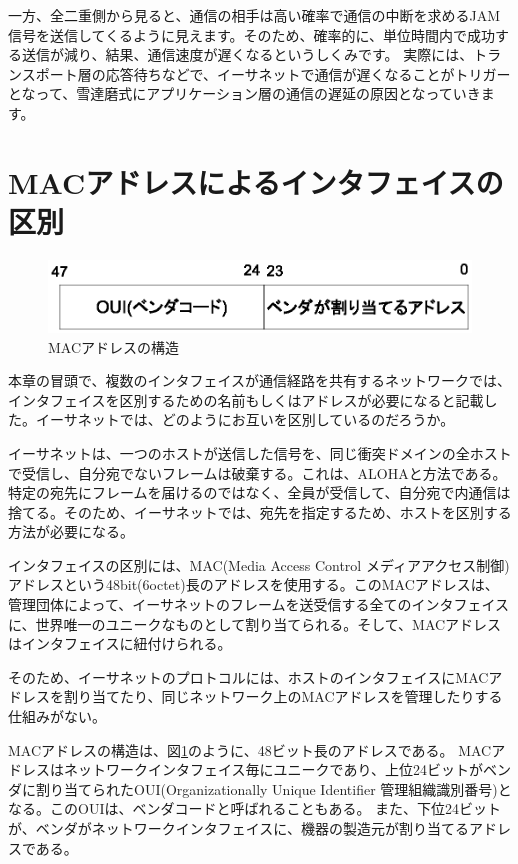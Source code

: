 一方、全二重側から見ると、通信の相手は高い確率で通信の中断を求めるJAM信号を送信してくるように見えます。そのため、確率的に、単位時間内で成功する送信が減り、結果、通信速度が遅くなるというしくみです。
実際には、トランスポート層の応答待ちなどで、イーサネットで通信が遅くなることがトリガーとなって、雪達磨式にアプリケーション層の通信の遅延の原因となっていきます。





\section{MACアドレスによるインタフェイスの区別}

\begin{figure}[htbp]
	\includegraphics[width=12cm,clip]{draw/macaddr.eps}
	\caption{MACアドレスの構造}
	\label{fig:macaddress}
\end{figure}

本章の冒頭で、複数のインタフェイスが通信経路を共有するネットワークでは、インタフェイスを区別するための名前もしくはアドレスが必要になると記載した。イーサネットでは、どのようにお互いを区別しているのだろうか。

イーサネットは、一つのホストが送信した信号を、同じ衝突ドメインの全ホストで受信し、自分宛でないフレームは破棄する。これは、ALOHAと方法である。特定の宛先にフレームを届けるのではなく、全員が受信して、自分宛で内通信は捨てる。そのため、イーサネットでは、宛先を指定するため、ホストを区別する方法が必要になる。

インタフェイスの区別には、MAC(Media Access Control メディアアクセス制御)アドレスという48bit(6octet)長のアドレスを使用する。このMACアドレスは、管理団体によって、イーサネットのフレームを送受信する全てのインタフェイスに、世界唯一のユニークなものとして割り当てられる。そして、MACアドレスはインタフェイスに紐付けられる。

そのため、イーサネットのプロトコルには、ホストのインタフェイスにMACアドレスを割り当てたり、同じネットワーク上のMACアドレスを管理したりする仕組みがない。



MACアドレスの構造は、図\ref{fig:macaddress}のように、48ビット長のアドレスである。
MACアドレスはネットワークインタフェイス毎にユニークであり、上位24ビットがベンダに割り当てられたOUI(Organizationally Unique Identifier 管理組織識別番号)となる。このOUIは、ベンダコードと呼ばれることもある。
また、下位24ビットが、ベンダがネットワークインタフェイスに、機器の製造元が割り当てるアドレスである。

